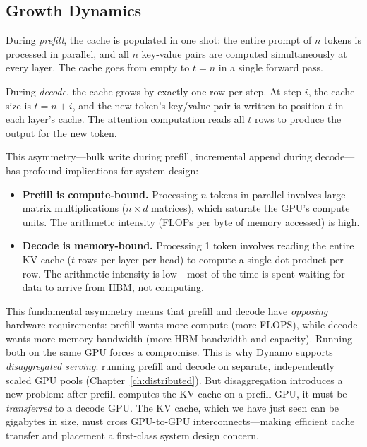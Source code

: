 \subsection{Growth Dynamics}

%
During \emph{prefill}, the cache is populated in one shot: the entire prompt of $n$ tokens is processed in parallel, and all $n$ key-value pairs are computed simultaneously at every layer. The cache goes from empty to $t = n$ in a single forward pass.

During \emph{decode}, the cache grows by exactly one row per step. At step $i$, the cache size is $t = n + i$, and the new token's key/value pair is written to position $t$ in each layer's cache. The attention computation reads all $t$ rows to produce the output for the new token.

This asymmetry---bulk write during prefill, incremental append during decode---has profound implications for system design:

\begin{itemize}
  \item \textbf{Prefill is compute-bound.} Processing $n$ tokens in parallel involves large matrix multiplications ($n \times d$ matrices), which saturate the GPU's compute units. The arithmetic intensity (FLOPs per byte of memory accessed) is high.
  \item \textbf{Decode is memory-bound.} Processing 1 token involves reading the entire KV cache ($t$ rows per layer per head) to compute a single dot product per row. The arithmetic intensity is low---most of the time is spent waiting for data to arrive from HBM, not computing.
\end{itemize}

This fundamental asymmetry means that prefill and decode have \emph{opposing} hardware requirements: prefill wants more compute (more FLOPS), while decode wants more memory bandwidth (more HBM bandwidth and capacity). Running both on the same GPU forces a compromise. This is why Dynamo supports \emph{disaggregated serving}: running prefill and decode on separate, independently scaled GPU pools (Chapter~\ref{ch:distributed}). But disaggregation introduces a new problem: after prefill computes the KV cache on a prefill GPU, it must be \emph{transferred} to a decode GPU. The KV cache, which we have just seen can be gigabytes in size, must cross GPU-to-GPU interconnects---making efficient cache transfer and placement a first-class system design concern.

